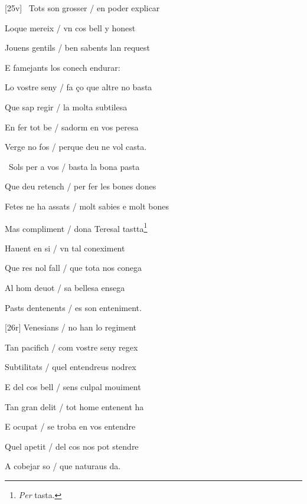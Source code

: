 \documentclass[12pt]{article}
\begin{document}
\begin{estrofa}

 [25v] \textparagraph\  Tots son grosser / en poder explicar

 Loque mereix / vn cos bell y honest

 Jouens gentils / ben sabents lan request

 E famejants los conech endurar:

 Lo vostre seny / fa \c{c}o que altre no basta

 Que sap regir / la molta subtilesa

 En fer tot be / sadorm en vos peresa

 Verge no fos / perque deu ne vol casta.

\end{estrofa}



\begin{estrofa}

 \textparagraph\  Sols per a vos / basta la bona pasta

 Que deu retench / per fer les bones dones

 Fetes ne ha assats / molt sabies e molt bones

 Mas compliment / dona Teresal tastta\footnote{\textit{Per} tasta.}

 Hauent en si / vn tal coneximent

 Que res nol fall / que tota nos conega

 Al hom deuot / sa bellesa ensega

 Pasts dentenents / es son enteniment.

\end{estrofa}



\begin{estrofa}

 [26r] Venesians / no han lo regiment

 Tan pacifich / com vostre seny regex

 Subtilitats / quel entendreus nodrex

 E del cos bell / sens culpal mouiment

 Tan gran delit / tot home entenent ha

 E ocupat / se troba en vos entendre

 Quel apetit / del cos nos pot stendre

 A cobejar so / que naturaus da.

\end{estrofa}





\begin{estrofaBuida}


\end{estrofaBuida}
\end{document}

